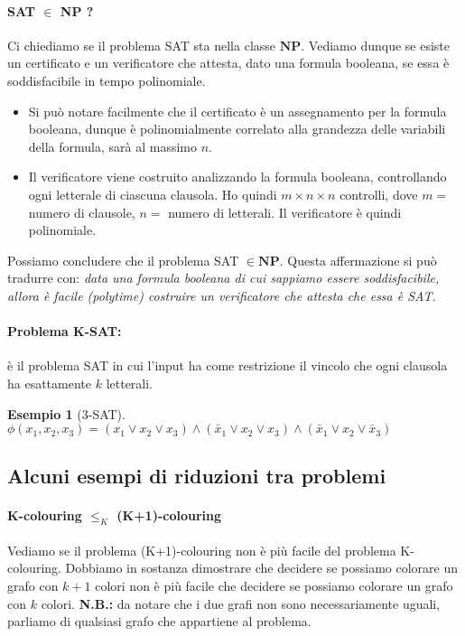 \documentclass[a4paper]{article}
\theoremstyle{definition}
\newtheorem{esempio}{Esempio}[subsection]
\newcommand{\np}{\mathbf{NP}}
\begin{document}
		\paragraph{SAT $ \in $ NP ?} Ci chiediamo se il problema SAT sta nella classe $ \np $. Vediamo dunque se esiste un certificato e un verificatore che attesta, dato una formula booleana, se essa è soddisfacibile in tempo polinomiale.
		\begin{itemize}
			\item Si può notare facilmente che il certificato è un assegnamento per la formula booleana, dunque è polinomialmente correlato alla grandezza delle variabili della formula, sarà al massimo $ n $.
			\item Il verificatore viene costruito analizzando la formula booleana, controllando ogni letterale di ciascuna clausola. Ho quindi $ m\times n \times n $ controlli, dove $ m = $ numero di clausole, $ n = $ numero di letterali. Il verificatore è quindi polinomiale.
		\end{itemize}
		Possiamo concludere che il problema SAT $ \in \np $. Questa affermazione si può tradurre con: \textit{data una formula booleana di cui sappiamo essere soddisfacibile, allora è facile (polytime) costruire un verificatore che attesta che essa è SAT.}
		
		\paragraph{Problema K-SAT:} è il problema SAT in cui l'input ha come restrizione il vincolo che ogni clausola ha esattamente $ k $ letterali.
		
		\begin{esempio}[3-SAT]
			$ \phi(x_1, x_2, x_3) = (x_1\vee x_2 \vee x_3)\wedge (\bar{x}_1\vee x_2 \vee x_3 ) \wedge (\bar{x}_1 \vee x_2\vee \bar{x}_3) $
		\end{esempio}
		  
		\subsection{Alcuni esempi di riduzioni tra problemi}
			\paragraph{K-colouring $ \leq_K $ (K+1)-colouring} Vediamo se il problema (K+1)-colouring non è più facile del problema K-colouring. Dobbiamo in sostanza dimostrare che decidere se possiamo colorare un grafo con $ k+1 $ colori non è più facile che decidere se possiamo colorare un grafo con $ k $ colori. \textbf{N.B.:} da notare che i due grafi non sono necessariamente uguali, parliamo di qualsiasi grafo che appartiene al problema.
			
\end{document}
